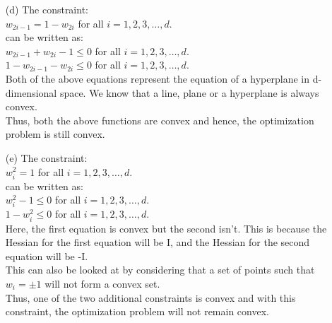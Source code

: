 \documentclass[fleqn]{article}
\begin{document}
\begin{itemize}
        \item[(d)]
		The constraint:\\
		$w_{2i - 1} = 1 - w_{2i}$ for all $i = 1, 2, 3, \dots, d.$\\
		can be written as:\\
		$w_{2i - 1} + w_{2i} - 1 \leq 0$ for all $i = 1, 2, 3, \dots, d.$\\
		$1 - w_{2i - 1} - w_{2i} \leq 0$ for all $i = 1, 2, 3, \dots, d.$\\
		Both of the above equations represent the equation of a hyperplane in d-dimensional space. We know that a line, plane or a hyperplane is always convex.\\
		Thus, both the above functions are convex and hence, the optimization problem is still convex.\\
	\item[(e)] The constraint:\\
		$w_i^2 = 1$ for all $i = 1, 2, 3, \dots, d.$\\
		can be written as:\\
		$w_i^2 - 1 \leq 0$ for all $i = 1, 2, 3, \dots, d.$\\
		$1 - w_i^2 \leq 0$ for all $i = 1, 2, 3, \dots, d.$\\
		Here, the first equation is convex but the second isn't.
		This is because the Hessian for the first equation will be I, and the Hessian for the second equation will be -I.\\
		This can also be looked at by considering that a set of points such that $w_i = \pm1$ will not form a convex set.\\
		Thus, one of the two additional constraints is convex and with this constraint, the optimization problem will not remain convex.
\end{itemize}
\end{document}
